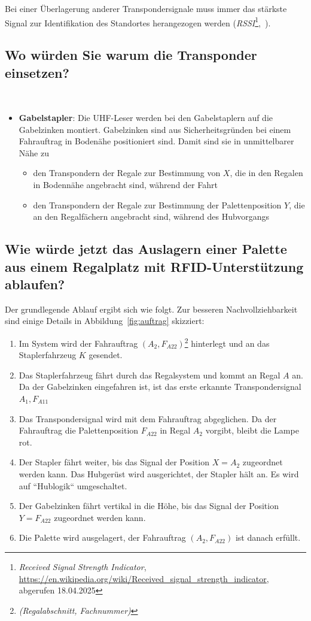 \noindent
Bei einer Überlagerung anderer Transpondersignale muss immer das stärkste Signal zur Identifikation des Standortes herangezogen werden (\textit{RSSI}\footnote{\textit{Received Signal Strength Indicator}, \url{https://en.wikipedia.org/wiki/Received_signal_strength_indicator}, abgerufen 18.04.2025},~\cite[136]{ES5}).


\subsection*{Wo würden Sie warum die Transponder einsetzen?}\\
\begin{itemize}
    \itemsep0.5em
    \item \textbf{Gabelstapler}: Die UHF-Leser werden bei den Gabelstaplern auf die Gabelzinken montiert. Gabelzinken sind aus Sicherheitsgründen bei einem Fahrauftrag in Bodenähe positioniert sind. Damit sind sie in unmittelbarer Nähe zu
    \begin{itemize}
        \item den Transpondern der Regale zur Bestimmung von $X$, die in den Regalen in Bodennähe angebracht sind, während der Fahrt
        \item den Transpondern der Regale zur Bestimmung der Palettenposition $Y$, die an den Regalfächern angebracht sind, während des Hubvorgangs
    \end{itemize}
\end{itemize}

\subsection*{Wie würde jetzt das Auslagern einer Palette aus einem Regalplatz mit RFID-Unterstützung ablaufen?}
Der grundlegende Ablauf ergibt sich wie folgt.
Zur besseren Nachvollziehbarkeit sind einige Details in Abbildung~\ref{fig:auftrag} skizziert:

\begin{enumerate}
    \itemsep0.5em
    \item Im System wird der Fahrauftrag $(A_2, F_{A22})$\footnote{\textit{(Regalabschnitt, Fachnummer)}} hinterlegt und an das Staplerfahrzeug $K$ gesendet.
    \item Das Staplerfahrzeug fährt durch das Regalsystem und kommt an Regal $A$ an.
    Da der Gabelzinken eingefahren ist, ist das erste erkannte Transpondersignal $A_1, F_{A11}$
    \item Das Transpondersignal wird mit dem Fahrauftrag abgeglichen.
    Da der Fahrauftrag die Palettenposition $F_{A22}$ in Regal $A_2$ vorgibt, bleibt die Lampe rot.
    \item Der Stapler fährt weiter, bis das Signal der Position $X=A_{2}$ zugeordnet werden kann. Das Hubgerüst wird ausgerichtet,
    der Stapler hält an. Es wird auf ``Hublogik`` umgeschaltet.
    \item Der Gabelzinken fährt vertikal in die Höhe, bis das Signal der Position $Y=F_{A22}$ zugeordnet werden kann.
    \item Die Palette wird ausgelagert, der Fahrauftrag $(A_2, F_{A22})$ ist danach erfüllt.
\end{enumerate}




